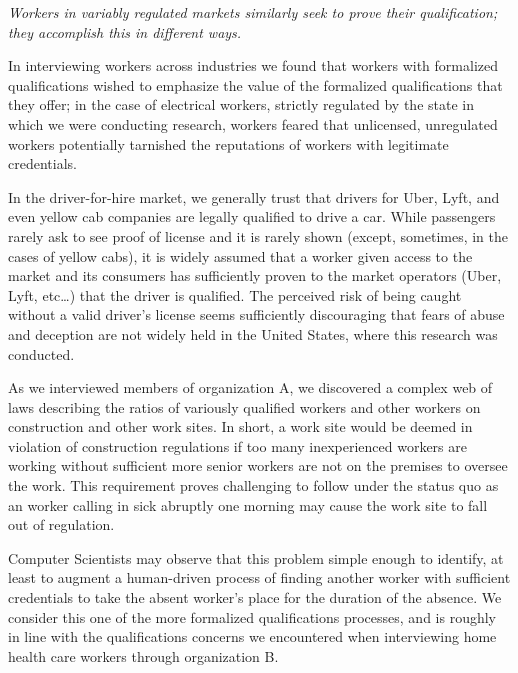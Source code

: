 \textit{Workers in variably regulated markets similarly seek to prove their qualification;
they accomplish this in different ways.}

In interviewing workers across industries we found that workers with formalized qualifications wished to emphasize the value of the formalized qualifications that they offer;
in the case of electrical workers, strictly regulated by the state in which we were conducting research, workers feared that unlicensed, unregulated workers potentially tarnished the reputations of workers with legitimate credentials.

In the driver-for-hire market, we generally trust that drivers for Uber, Lyft, and even yellow cab companies are legally qualified to drive a car.
While passengers rarely ask to see proof of license and it is rarely shown (except, sometimes, in the cases of yellow cabs), it is widely assumed that a worker given access to the market and its consumers has sufficiently proven to the market operators (Uber, Lyft, etc\dots) that the driver is qualified.
The perceived risk of being caught without a valid driver's license seems sufficiently discouraging that fears of abuse and deception are not widely held in the United States, where this research was conducted.

As we interviewed members of organization A, we discovered a complex web of laws describing the ratios of variously qualified workers and other workers on construction and other work sites.
In short, a work site would be deemed in violation of construction regulations if too many inexperienced workers are working without sufficient more senior workers are not on the premises to oversee the work.
This requirement proves challenging to follow under the status quo as an worker calling in sick abruptly one morning may cause the work site to fall out of regulation.

Computer Scientists may observe that this problem simple enough to identify, at least to augment a human-driven process of finding another worker with sufficient credentials to take the absent worker's place for the duration of the absence.
We consider this one of the more formalized qualifications processes, and is roughly in line with the qualifications concerns we encountered when interviewing home health care workers through organization B.

